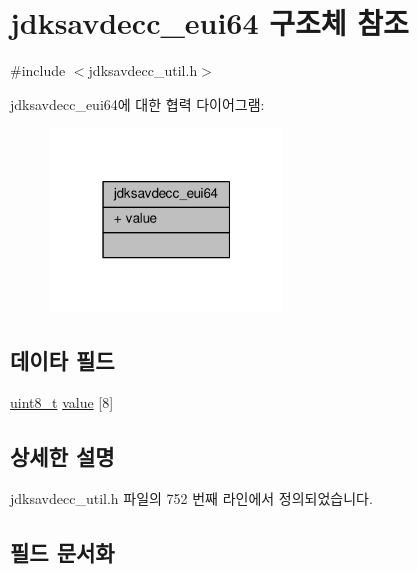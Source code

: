 \hypertarget{structjdksavdecc__eui64}{}\section{jdksavdecc\+\_\+eui64 구조체 참조}
\label{structjdksavdecc__eui64}


{\ttfamily \#include $<$jdksavdecc\+\_\+util.\+h$>$}



jdksavdecc\+\_\+eui64에 대한 협력 다이어그램\+:
\nopagebreak
\begin{figure}[H]
\begin{center}
\leavevmode
\includegraphics[width=175pt]{structjdksavdecc__eui64__coll__graph}
\end{center}
\end{figure}
\subsection*{데이타 필드}
\begin{DoxyCompactItemize}
\item 
\hyperlink{stdint_8h_aba7bc1797add20fe3efdf37ced1182c5}{uint8\+\_\+t} \hyperlink{structjdksavdecc__eui64_ac7a8beb4da4fc8eb8acfec13711a134f}{value} \mbox{[}8\mbox{]}
\end{DoxyCompactItemize}


\subsection{상세한 설명}


jdksavdecc\+\_\+util.\+h 파일의 752 번째 라인에서 정의되었습니다.



\subsection{필드 문서화}
